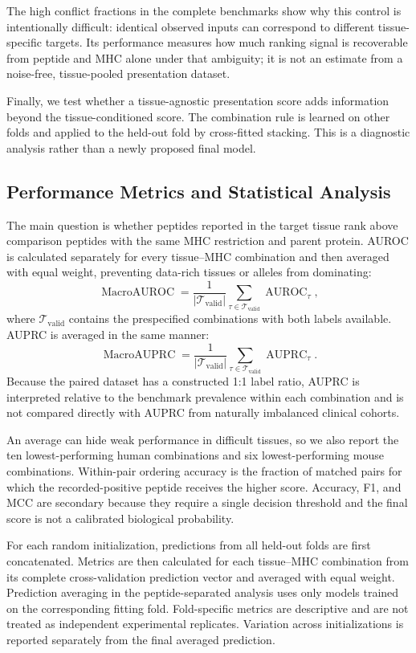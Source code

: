 The high conflict fractions in the complete benchmarks show why this control is intentionally difficult: identical observed inputs can correspond to different tissue-specific targets. Its performance measures how much ranking signal is recoverable from peptide and MHC alone under that ambiguity; it is not an estimate from a noise-free, tissue-pooled presentation dataset.

Finally, we test whether a tissue-agnostic presentation score adds information beyond the tissue-conditioned score. The combination rule is learned on other folds and applied to the held-out fold by cross-fitted stacking. This is a diagnostic analysis rather than a newly proposed final model.

\subsection{Performance Metrics and Statistical Analysis}

The main question is whether peptides reported in the target tissue rank above comparison peptides with the same MHC restriction and parent protein. AUROC is calculated separately for every tissue--MHC combination and then averaged with equal weight, preventing data-rich tissues or alleles from dominating:
\[
\operatorname{MacroAUROC}
=
\frac{1}{|\mathcal{T}_{\mathrm{valid}}|}
\sum_{\tau\in\mathcal{T}_{\mathrm{valid}}}
\operatorname{AUROC}_{\tau},
\]
where \(\mathcal{T}_{\mathrm{valid}}\) contains the prespecified combinations with both labels available. AUPRC is averaged in the same manner:
\[
\operatorname{MacroAUPRC}
=
\frac{1}{|\mathcal{T}_{\mathrm{valid}}|}
\sum_{\tau\in\mathcal{T}_{\mathrm{valid}}}
\operatorname{AUPRC}_{\tau}.
\]
Because the paired dataset has a constructed 1:1 label ratio, AUPRC is interpreted relative to the benchmark prevalence within each combination and is not compared directly with AUPRC from naturally imbalanced clinical cohorts.

An average can hide weak performance in difficult tissues, so we also report the ten lowest-performing human combinations and six lowest-performing mouse combinations. Within-pair ordering accuracy is the fraction of matched pairs for which the recorded-positive peptide receives the higher score. Accuracy, F1, and MCC are secondary because they require a single decision threshold and the final score is not a calibrated biological probability.

For each random initialization, predictions from all held-out folds are first concatenated. Metrics are then calculated for each tissue--MHC combination from its complete cross-validation prediction vector and averaged with equal weight. Prediction averaging in the peptide-separated analysis uses only models trained on the corresponding fitting fold. Fold-specific metrics are descriptive and are not treated as independent experimental replicates. Variation across initializations is reported separately from the final averaged prediction.

